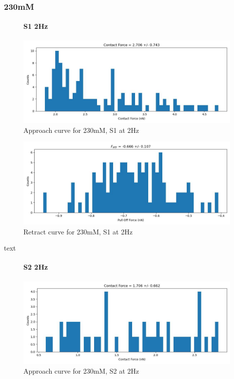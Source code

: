 \subsubsection*{230mM}

\begin{figure}[h!]
\paragraph{S1 2Hz}
\centering
\includegraphics[width=\textwidth]{chapter7/Tip speed/230mM/S1 2Hz/approach_f_c_hist.jpg}
\caption{Approach curve for 230mM, S1 at 2Hz}
\end{figure}

\begin{figure}[h!]
\centering
\includegraphics[width=\textwidth]{chapter7/Tip speed/230mM/S1 2Hz/retract_f_a_hist.jpg}
\caption{Retract curve for 230mM, S1 at 2Hz}
\end{figure}
text
\newpage


\begin{figure}[h!]
\paragraph{S2 2Hz}
\centering
\includegraphics[width=\textwidth]{chapter7/Tip speed/230mM/S2 2Hz/approach_f_c_hist.jpg}
\caption{Approach curve for 230mM, S2 at 2Hz}
\end{figure}

